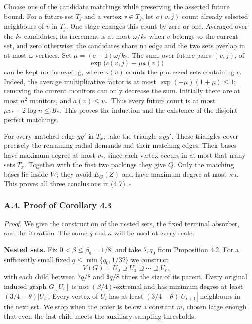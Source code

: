 \documentclass[english,11pt,a4paper]{article}
\begin{document}
Choose one of the candidate matchings while preserving the asserted future bound. For a future set \(T_j\) and a vertex \(v\in T_j\), let \(c(v,j)\) count already selected neighbours of \(v\) in \(T_j\). One stage changes this count by zero or one. Averaged over the \(k_*\) candidates, its increment is at most \(\omega/k_*\) when \(v\) belongs to the current set, and zero otherwise: the candidates share no edge and the two sets overlap in at most \(\omega\) vertices. Set \(\mu=(\mathrm e-1)\omega/k_*\). The sum, over future pairs \((v,j)\), of \[\exp\bigl(c(v,j)-\mu a(v)\bigr)\] can be kept nonincreasing, where \(a(v)\) counts the processed sets containing \(v\). Indeed, the average multiplicative factor is at most \(\exp(-\mu)(1+\mu)\le1\); removing the current monitors can only decrease the sum. Initially there are at most \(n^2\) monitors, and \(a(v)\le v_*\). Thus every future count is at most \(\mu v_*+2\log n\le B_*\). This proves the induction and the existence of the disjoint perfect matchings.

For every matched edge \(yy'\) in \(T_x\), take the triangle \(xyy'\). These triangles cover precisely the remaining radial demands and their matching edges. Their bases have maximum degree at most \(v_*\), since each vertex occurs in at most that many sets \(T_x\). Together with the first two packings they give \(Q\). Only the matching bases lie inside \(W\); they avoid \(E_G(Z)\) and have maximum degree at most \(\kappa u\). This proves all three conclusions in (4.7). \(\square\)

\subsubsection{A.4. Proof of Corollary 4.3}\label{a.4.-proof-of-corollary-4.3}

\emph{Proof.} We give the construction of the nested sets, the fixed terminal absorber, and the iteration. The same \(q\) and \(\kappa\) will be used at every scale.

\textbf{Nested sets.} Fix \(0<\beta\le\beta_0=1/8\), and take \(\theta,q_0\) from Proposition 4.2. For a sufficiently small fixed \(q\le\min\{q_0,1/32\}\) we construct \[V(G)=U_0\supseteq U_1\supseteq\cdots\supseteq U_\ell,
\tag{A.5}\] with each child between \(7q/8\) and \(9q/8\) times the size of its parent. Every original induced graph \(G[U_i]\) is not \((\beta/4)\)-extremal and has minimum degree at least \((3/4-\theta)|U_i|\). Every vertex of \(U_i\) has at least \((3/4-\theta)|U_{i+1}|\) neighbours in the next set. We stop when the order is below a constant \(m\), chosen large enough that even the last child meets the auxiliary sampling thresholds.
\end{document}
